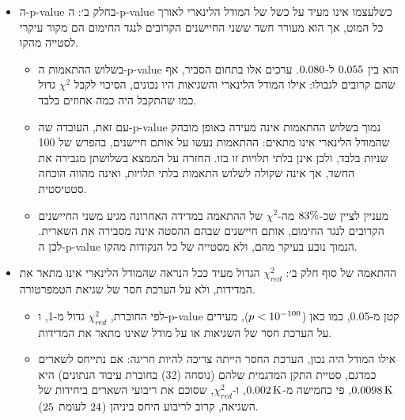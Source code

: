 \documentclass[10pt,a4paper]{article}
\newcommand{\textenglish}[1]{\foreignlanguage{english}{#1}}
\newcommand{\U}[1]{\,\mathrm{#1}}
\begin{document}
\begin{itemize}
\begin{itemize}
    \item לעומת זאת, הסבר אפשרי אחר מתיישב עם הסימנים ההפוכים: ייתכן שההסטה של כל חיישן משתנה עם הטמפרטורה, דבר שכפי שצוין בתוצאות לא ניתן היה לבדוק. במקרה כזה, השינוי בהסטה צפוי להיות גדול יותר בחיישנים שהתחממו יותר, ובהם חיישנים 1 ו-2, החמים ביותר, וכיוונו יכול להיות שונה בכל חיישן. לכן הנתונים מתאימים יותר להסבר זה. מדידת ההסטות בטמפרטורה נוספת, כפי שמוצע בפסקת המגבלות, תאפשר להכריע בין שני ההסברים.
  \end{itemize}
  \item ה-\textenglish{p-value} בחלק ב׳: ה-\textenglish{p-value} כשלעצמו אינו מעיד על כשל של המודל הלינארי לאורך כל המוט, אך הוא מעורר חשד ששני החיישנים הקרובים לנגד החימום הם מקור עיקרי לסטייה מהקו.
  \begin{itemize}\setlength{\itemsep}{0pt}\setlength{\parskip}{0pt}
    \item בשלוש ההתאמות ה-\textenglish{p-value} הוא בין $0.055$ ל-$0.080$. ערכים אלו בתחום הסביר, אף שהם קרובים לגבולו: אילו המודל הלינארי והשגיאות היו נכונים, הסיכוי לקבל $\chi^2$ גדול כמו שהתקבל היה כמה אחוזים בלבד.
    \item עם זאת, העובדה שה-\textenglish{p-value} נמוך בשלוש ההתאמות אינה מעידה באופן מובהק שהמודל הלינארי אינו מתאים: ההתאמות נעשו על אותם חיישנים, בהפרש של 100 שניות בלבד, ולכן אינן בלתי תלויות זו בזו. החזרה על הממצא בשלושתן מגבירה את החשד, אך אינה שקולה לשלוש התאמות בלתי תלויות, ואינה מהווה הוכחה סטטיסטית.
    \item מעניין לציין שכ-$83\%$ מה-$\chi^2$ של ההתאמה במדידה האחרונה מגיע משני החיישנים הקרובים לנגד החימום, אותם חיישנים שבהם ההסטה אינה מסבירה את השארית. לכן ה-\textenglish{p-value} הנמוך נובע בעיקר מהם, ולא מסטייה של כל הנקודות מהקו.
  \end{itemize}
  \item ההתאמה של סוף חלק ב׳: $\chi^2_{red}$ הגדול מעיד ככל הנראה שהמודל הלינארי אינו מתאר את המדידות, ולא על הערכת חסר של שגיאת הטמפרטורה.
  \begin{itemize}\setlength{\itemsep}{0pt}\setlength{\parskip}{0pt}
    \item לפי החוברת, $\chi^2_{red}$ גדול מ-1, ו-\textenglish{p-value} קטן מ-0.05, כמו כאן ($p < 10^{-100}$), מעידים על הערכת חסר של השגיאות או על מודל שאינו מתאר את המדידות.
    \item אילו המודל היה נכון, הערכת החסר הייתה צריכה להיות חריגה: אם נתייחס לשארים כמדגם, סטיית התקן המדגמית שלהם (נוסחה (32) בחוברת עיבוד הנתונים) היא $\DExpRms\U{K}$, פי כחמישה מ-$\TErr\U{K}$, ו-$\chi^2_{red}$, שסוכם את ריבועי השארים ביחידות של השגיאה, קרוב לריבוע היחס ביניהן ($24$ לעומת $25$).

\end{itemize}
\end{itemize}
\end{document}
